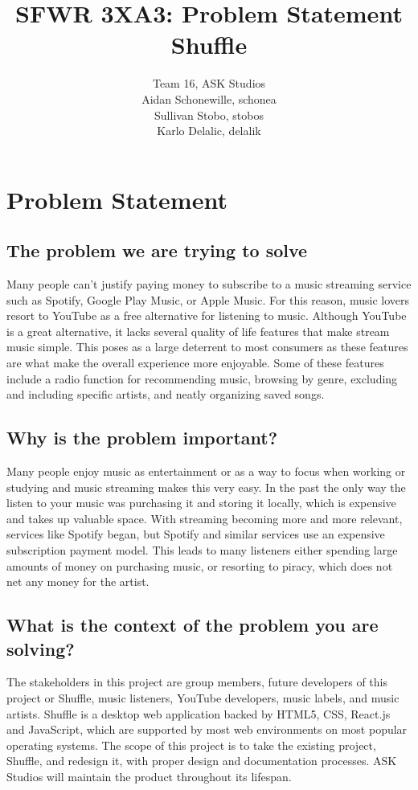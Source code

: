 \documentclass[12pt, a4paper]{article}
\title{SFWR 3XA3: Problem Statement Shuffle}
\author{Team 16, ASK Studios
        \\ Aidan Schonewille, schonea
        \\ Sullivan Stobo, stobos
        \\ Karlo Delalic, delalik
}
\begin{document}
\maketitle
\section{Problem Statement}
\subsection{The problem we are trying to solve}
Many people can't justify paying money to subscribe to a music streaming service such as Spotify, Google Play Music, or Apple Music. For this reason, music lovers resort to YouTube as a free alternative for listening to music. Although YouTube is a great alternative, it lacks several quality of life features that make stream music simple. This poses as a large deterrent to most consumers as these features are what make the overall experience more enjoyable. Some of these features include a radio function for recommending music, browsing by genre, excluding and including specific artists, and neatly organizing saved songs.

\subsection{Why is the problem important?}
Many people enjoy music as entertainment or as a way to focus when working or studying and music streaming makes this very easy. In the past the only way the listen to your music was purchasing it and storing it locally, which is expensive and takes up valuable space.  With streaming becoming more and more relevant, services like Spotify began, but Spotify and similar services use an expensive subscription payment model.  This leads to many listeners either spending large amounts of money on purchasing music, or resorting to piracy, which does not net any money for the artist.

\subsection{What is the context of the problem you are solving?}
The stakeholders in this project are group members, future developers of this project or Shuffle, music listeners, YouTube developers, music labels, and music artists.  Shuffle is a desktop web application backed by HTML5, CSS, React.js and JavaScript, which are supported by most web environments on most popular operating systems.  The scope of this project is to take the existing project, Shuffle, and redesign it, with proper design and documentation processes.  ASK Studios will maintain the product throughout its lifespan.
\end{document}
